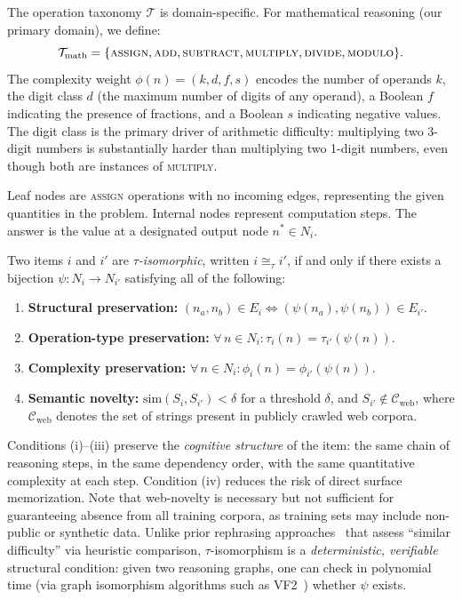The operation taxonomy $\mathcal{T}$ is domain-specific. For
mathematical reasoning (our primary domain), we define:
\begin{equation}
\mathcal{T}_{\text{math}} = \{\textsc{assign}, \textsc{add},
\textsc{subtract}, \textsc{multiply}, \textsc{divide},
\textsc{modulo}\}.
\label{eq:taxonomy}
\end{equation}
The complexity weight $\phi(n) = (k, d, f, s)$ encodes the number of
operands $k$, the digit class $d$ (the maximum number of digits of any
operand), a Boolean $f$ indicating the presence of fractions, and a
Boolean $s$ indicating negative values. The digit class is the primary
driver of arithmetic difficulty: multiplying two 3-digit numbers is
substantially harder than multiplying two 1-digit numbers, even though
both are instances of \textsc{multiply}.

Leaf nodes are \textsc{assign} operations with no incoming edges,
representing the given quantities in the problem. Internal nodes
represent computation steps. The answer is the value at a designated
output node $n^* \in N_i$.

\begin{definition}
\label{def:isomorphism}
Two items $i$ and $i'$ are \emph{$\tau$-isomorphic}, written
$i \cong_\tau i'$, if and only if there exists a bijection
$\psi : N_i \to N_{i'}$ satisfying all of the following:
\begin{enumerate}[nosep, leftmargin=*, label=(\roman*)]
\item \textbf{Structural preservation:} $(n_a, n_b) \in E_i
  \iff (\psi(n_a), \psi(n_b)) \in E_{i'}$.
\item \textbf{Operation-type preservation:}
  $\forall\, n \in N_i : \tau_i(n) = \tau_{i'}(\psi(n))$.
\item \textbf{Complexity preservation:}
  $\forall\, n \in N_i : \phi_i(n) = \phi_{i'}(\psi(n))$.
\item \textbf{Semantic novelty:}
  $\mathrm{sim}(S_i, S_{i'}) < \delta$ for a threshold $\delta$, and
  $S_{i'} \notin \mathcal{C}_{\mathrm{web}}$, where
  $\mathcal{C}_{\mathrm{web}}$ denotes the set of strings present in
  publicly crawled web corpora.
\end{enumerate}
\end{definition}

\noindent
Conditions (i)--(iii) preserve the \emph{cognitive structure} of the
item: the same chain of reasoning steps, in the same dependency order,
with the same quantitative complexity at each step. Condition (iv)
reduces the risk of direct surface memorization. Note that web-novelty
is necessary but not sufficient for guaranteeing absence from all
training corpora, as training sets may include non-public or synthetic
data. Unlike prior rephrasing
approaches~\cite{dekoninck2024constat,zhang2024gsm1k} that assess
``similar difficulty'' via heuristic comparison, $\tau$-isomorphism is a
\emph{deterministic, verifiable} structural condition: given two
reasoning graphs, one can check in polynomial time (via graph
isomorphism algorithms such as VF2~\cite{cordella2004vf2}) whether
$\psi$ exists.

